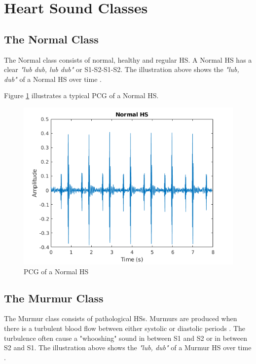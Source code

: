 \documentclass[10pt,twocolumn]{witseiepaper}
\begin{document}
\twocolumn
\section{Heart Sound Classes}
\label{HS}

\subsection*{The Normal Class}
The Normal class consists of normal, healthy and regular HS. A Normal HS has a clear \textit{"lub dub, lub dub"} or S1-S2-S1-S2. The illustration above shows the \textit{"lub, dub"} of a Normal HS over time \cite{bentley}.


Figure \ref{fig:normal} illustrates a typical PCG of a Normal HS.
\begin{figure}[h!]
    \centering
    \includegraphics[scale = 0.45]{./normal.png}
    \caption{PCG of a Normal HS}
    \label{fig:normal}
\end{figure}{}

\subsection*{The Murmur Class}
The Murmur class consists of pathological HSs. Murmurs are produced when there is a turbulent blood flow between either systolic or diastolic periods \cite{35}. The turbulence often cause a "whooshing" sound in between S1 and S2 or in between S2 and S1. The illustration above shows the \textit{"lub, dub"} of a Murmur HS over time \cite{bentley}.
\end{document}
